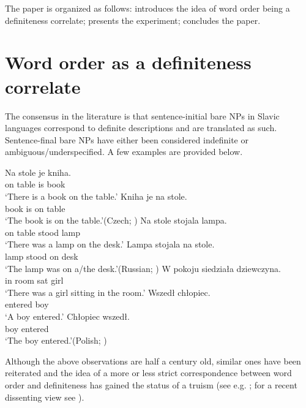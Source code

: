 \documentclass[output=paper]{langscibook}
\begin{document}
The paper is organized as follows:  introduces the idea of word order being a definiteness correlate;  presents the experiment;  concludes the paper.

\section{Word order as a definiteness correlate}\label{sim-dem:sec:wo}

The consensus in the literature is that sentence-initial bare NPs in Slavic languages correspond to definite descriptions and are translated as such. Sentence-final bare NPs have either been considered indefinite or ambiguous/under\-speci\-fied. A few examples are provided below.

\ea\ea\gll Na stole je kniha.\\
on table is book\\
\glt `There is a book on the table.'
\ex\gll Kniha je na stole.\\
book is on table\\
\glt `The book is on the table.'\hfill (Czech; \citealt[42]{Kramsky1972})
\z\ex\label{sim-dem:ex:rus1}\ea\gll Na stole stojala lampa.\\
on table stood lamp\\
\glt `There was a lamp on the desk.'
\ex\gll Lampa stojala na stole.\\
lamp stood on desk\\
\glt `The lamp was on a/the desk.'\hfill (Russian; \citealt[266]{Chvany1973})
\z\ex\label{sim-dem:ex:pol1}\gll W pokoju siedziała dziewczyna.\\
in room sat girl\\
\glt `There was a girl sitting in the room.'
\ea\gll Wszedł chłopiec.\label{sim-dem:ex:pol1a}\\
entered boy\\
\glt `A boy entered.'
\ex\gll Chłopiec wszedł.\label{sim-dem:ex:pol1b}\\
boy entered\\
\glt `The boy entered.'\hfill (Polish; \citealt[215]{Szwedek1974a})
\z\z

\noindent Although the above observations are half a century old, similar ones have been reiterated and the idea of a more or less strict correspondence between word order and definiteness has gained the status of a truism (see e.g. \citealt{Szwedek1974,Szwedek2011,Hlavsa1975,Birkenmaier1979,Gladrow1979,Gladrow1989,Weiss1983,Yokoyama1986,Hauenschild1993,Junghanns.Zybatow1997,Nesset1999,Leiss2000,Brun2001,Biskup2006,Kucerova2007,Kucerova2012,Topolinjska2009,Geist2010,Titov2012,Titov2017,Czardybon2017}; for a recent dissenting view see \citealt{Buncic2014}).
\end{document}
